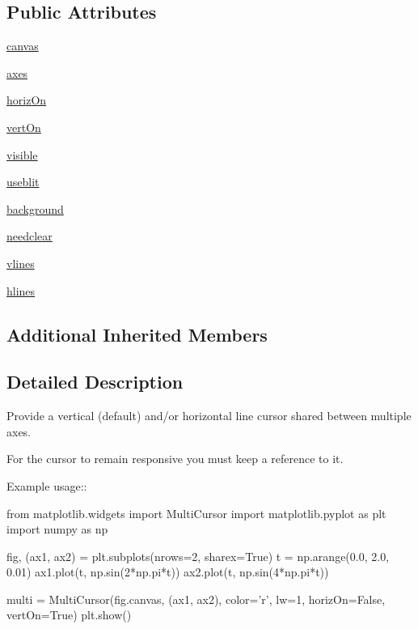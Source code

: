 \subsection*{Public Attributes}
\begin{DoxyCompactItemize}
\item 
\hyperlink{classmatplotlib_1_1widgets_1_1MultiCursor_a53b87f01c4591398f4f42e1e8852b6bd}{canvas}
\item 
\hyperlink{classmatplotlib_1_1widgets_1_1MultiCursor_a40f3498fea3710487d9f9c827052d48d}{axes}
\item 
\hyperlink{classmatplotlib_1_1widgets_1_1MultiCursor_a4169fa323f17c3b8ba0f887531633704}{horiz\+On}
\item 
\hyperlink{classmatplotlib_1_1widgets_1_1MultiCursor_a019f42179207723a771763a89ddcc6cb}{vert\+On}
\item 
\hyperlink{classmatplotlib_1_1widgets_1_1MultiCursor_a458255e4545f3dcd1e79493eaea66e9c}{visible}
\item 
\hyperlink{classmatplotlib_1_1widgets_1_1MultiCursor_a7c61d66b87dfc7f8bf44b272c7b2116d}{useblit}
\item 
\hyperlink{classmatplotlib_1_1widgets_1_1MultiCursor_a70849f1cd4bf553c2f7f2254bcca0fc4}{background}
\item 
\hyperlink{classmatplotlib_1_1widgets_1_1MultiCursor_aee3271ab54465d649855da6c8c69ce34}{needclear}
\item 
\hyperlink{classmatplotlib_1_1widgets_1_1MultiCursor_a743ea101b150c07f9c99d02558d634e6}{vlines}
\item 
\hyperlink{classmatplotlib_1_1widgets_1_1MultiCursor_a047396b64ca7e8a72d51d9a472cc550d}{hlines}
\end{DoxyCompactItemize}
\subsection*{Additional Inherited Members}


\subsection{Detailed Description}
\begin{DoxyVerb}Provide a vertical (default) and/or horizontal line cursor shared between
multiple axes.

For the cursor to remain responsive you must keep a reference to it.

Example usage::

    from matplotlib.widgets import MultiCursor
    import matplotlib.pyplot as plt
    import numpy as np

    fig, (ax1, ax2) = plt.subplots(nrows=2, sharex=True)
    t = np.arange(0.0, 2.0, 0.01)
    ax1.plot(t, np.sin(2*np.pi*t))
    ax2.plot(t, np.sin(4*np.pi*t))

    multi = MultiCursor(fig.canvas, (ax1, ax2), color='r', lw=1,
                        horizOn=False, vertOn=True)
    plt.show()\end{DoxyVerb}
 

